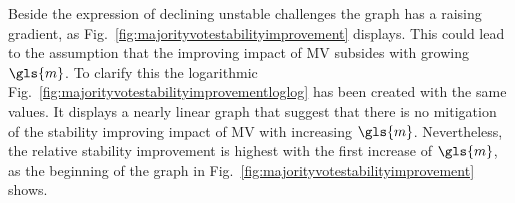 Beside the expression of declining unstable challenges the graph has a raising gradient, as Fig.\ \ref{fig:majorityvotestabilityimprovement} displays.
This could lead to the assumption that the improving impact of \ac{MV} subsides with growing $\gls{m}$.
To clarify this the logarithmic Fig.\ \ref{fig:majorityvotestabilityimprovementloglog} has been created with the same values.
It displays a nearly linear graph that suggest that there is no mitigation of the stability improving impact of \ac{MV} with increasing $\gls{m}$.
Nevertheless, the relative stability improvement is highest with the first increase of $\gls{m}$, as the beginning of the graph in Fig.\  \ref{fig:majorityvotestabilityimprovement} shows.


